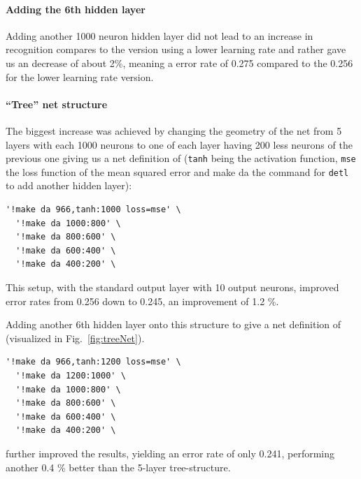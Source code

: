 \paragraph{Adding the 6th hidden layer} Adding another 1000 neuron hidden layer did not lead to an increase in recognition compares to the version using a lower learning rate and rather gave us an decrease of about 2\%, meaning a error rate of 0.275 compared to the 0.256 for the lower learning rate version.

\paragraph{``Tree'' net structure} The biggest increase was achieved by changing the geometry of the net from 5 layers with each 1000 neurons to one of each layer having 200 less neurons of the previous one giving us a net definition of (\texttt{tanh} being the activation function, \texttt{mse} the loss function of the mean squared error and make da the command for \texttt{detl} to add another hidden layer):

\begin{verbatim}'!make da 966,tanh:1000 loss=mse' \
  '!make da 1000:800' \
  '!make da 800:600' \
  '!make da 600:400' \
  '!make da 400:200' \
\end{verbatim}

This setup, with the standard output layer with 10 output neurons, improved error rates from 0.256 down to 0.245, an improvement of 1.2 \%.

Adding another 6th hidden layer onto this structure to give a net definition of (visualized in Fig.~\ref{fig:treeNet}).
\begin{verbatim}'!make da 966,tanh:1200 loss=mse' \
  '!make da 1200:1000' \
  '!make da 1000:800' \
  '!make da 800:600' \
  '!make da 600:400' \
  '!make da 400:200' \
\end{verbatim}

further improved the results, yielding an error rate of only 0.241, performing another 0.4 \% better than the 5-layer tree-structure. 


